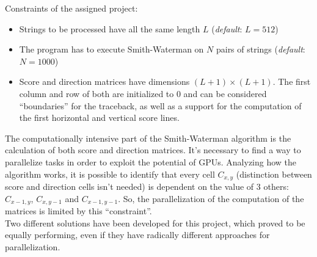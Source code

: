 \documentclass{article}
\begin{document}
\noindent Constraints of the assigned project:
\begin{itemize}
    \item Strings to be processed have all the same length \(L\) (\textit{default}: \(L = 512\))
    \item The program has to execute Smith-Waterman on \(N\) pairs of strings (\textit{default}: \(N = 1000\))
    \item Score and direction matrices have dimensions \((L+1) \times (L+1)\). The first column and row of both are initialized to 0 and can be considered ``boundaries'' for the traceback, as well as a support for the computation of the first horizontal and vertical score lines.
\end{itemize}
The computationally intensive part of the Smith-Waterman algorithm is the calculation of both score and direction matrices. It's necessary to find a way to parallelize tasks in order to exploit the potential of GPUs.
Analyzing how the algorithm works, it is possible to identify that every cell \(C_{x,y}\) (distinction between score and direction cells isn't needed) is dependent on the value of 3 others: \(C_{x-1,y}\), \(C_{x,y-1}\) and \(C_{x-1,y-1}\). So, the parallelization of the computation of the matrices is limited by this ``constraint''.\\

Two different solutions have been developed for this project, which proved to be equally performing, even if they have radically different approaches for parallelization.
\end{document}
